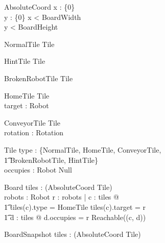 \documentclass[12pt]{article}
\begin{document}
\begin{schema}{AbsoluteCoord}
x : \nat \cup \{0\} \\
y : \nat \cup \{0\}
\where
x < BoardWidth \\
y < BoardHeight
\end{schema}


\begin{schema}{NormalTile}
Tile
\end{schema}

\begin{schema}{HintTile}
Tile
\end{schema}

\begin{schema}{BrokenRobotTile}
Tile
\end{schema}

\begin{schema}{HomeTile}
Tile \\
target : Robot
\end{schema}

\begin{schema}{ConveyorTile}
Tile \\
rotation : Rotation
\end{schema}

\begin{schema}{Tile}
type : \{NormalTile, HomeTile, ConveyorTile, \\ \t1 BrokenRobotTile, HintTile\} \\
occupies : Robot \cup Null
\end{schema}

\begin{schema}{Board}
tiles : \power (AbsoluteCoord \fun Tile) \\
robots : \power Robot
\where
\forall r : robots | \exists c : \dom tiles @  \\ \t1 tiles(c).type = HomeTile \wedge tiles(c).target = r \wedge \\ \t1 
\exists d : \dom tiles @ d.occupies = r \wedge Reachable((c, d))
\end{schema}

\begin{schema}{BoardSnapshot}
tiles : \power (AbsoluteCoord \fun Tile) \\
\end{schema}
\end{document}
